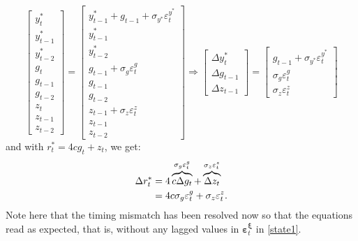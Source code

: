 \documentclass[a4paper,12pt]{article}
\newcommand{\vsp}[1]{\vspace*{#1mm}}\newcommand{\hsp}[1]{\hspace*{#1mm}}  }
\begin{document}
\begin{equation}
\begin{bmatrix}
y_{t}^{\ast } \\ 
y_{t-1}^{\ast } \\ 
y_{t-2}^{\ast } \\ 
g_{t} \\ 
g_{t-1} \\ 
g_{t-2} \\ 
z_{t} \\ 
z_{t-1} \\ 
z_{t-2}%
\end{bmatrix}%
=%
\begin{bmatrix}
y_{t-1}^{\ast }+g_{t-1}+\sigma _{y^{\ast }}\varepsilon _{t}^{y^{\ast }} \\ 
y_{t-1}^{\ast } \\ 
y_{t-2}^{\ast } \\ 
g_{t-1}+\sigma _{g}\varepsilon _{t}^{g} \\ 
g_{t-1} \\ 
g_{t-2} \\ 
z_{t-1}+\sigma _{z}\varepsilon _{t}^{z} \\ 
z_{t-1} \\ 
z_{t-2}%
\end{bmatrix}%
\Rightarrow 
\begin{bmatrix}
\Delta y_{t}^{\ast } \\ 
\Delta g_{t-1} \\ 
\Delta z_{t-1}%
\end{bmatrix}%
=%
\begin{bmatrix}
g_{t-1}+\sigma _{y^{\ast }}\varepsilon _{t}^{y^{\ast }} \\ 
\sigma _{g}\varepsilon _{t}^{g} \\ 
\sigma _{z}\varepsilon _{t}^{z}%
\end{bmatrix}
\label{lwb}
\end{equation}%
and with $r_{t}^{\ast }=4cg_{t}+z_{t}$, we get: \vsp{-4} 
\begin{align}
\Delta r_{t}^{\ast }& =4\overbrace{c\Delta g_{t}}^{\sigma _{g}\varepsilon
_{t}^{g}}+\overbrace{\Delta z_{t}}^{\sigma _{z}\varepsilon _{t}^{z}}  \notag
\\
& =4c\sigma _{g}\varepsilon _{t}^{g}+\sigma _{z}\varepsilon _{t}^{z}.
\label{drstar}
\end{align}%
Note here that the timing mismatch has been resolved now so that the
equations read as expected, that is, without any lagged values in $%
\boldsymbol{\varepsilon }_{t}^{\boldsymbol{\xi }}$ in \ref{state1}.
\end{document}
